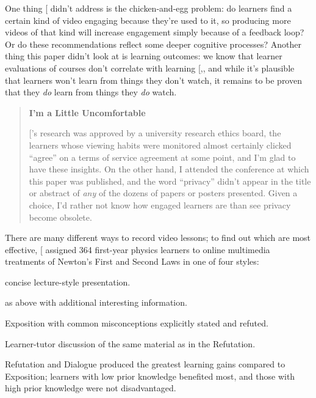 One thing {[}\protect[\hyperlink{b:Guo2014}{Guo2014}]{]} didn't address is the chicken-and-egg
problem: do learners find a certain kind of video engaging because
they're used to it, so producing more videos of that kind will
increase engagement simply because of a feedback loop? Or do these
recommendations reflect some deeper cognitive processes? Another thing
this paper didn't look at is learning outcomes: we know that learner
evaluations of courses don't correlate with learning
{[},\protect[\hyperlink{b:Uttl2017}{Uttl2017}]{]}, and while it's plausible that
learners won't learn from things they don't watch, it remains to be
proven that they \emph{do} learn from things they \emph{do} watch.

\begin{quote}\setlength{\parindent}{0pt}
\textbf{I'm a Little Uncomfortable}

{[}\protect[\hyperlink{b:Guo2014}{Guo2014}]{]}'s research was approved by a university research
ethics board, the learners whose viewing habits were monitored almost
certainly clicked ``agree'' on a terms of service agreement at some
point, and I'm glad to have these insights. On the other hand, I
attended the conference at which this paper was published, and the
word ``privacy'' didn't appear in the title or abstract of \emph{any} of the
dozens of papers or posters presented. Given a choice, I'd rather not
know how engaged learners are than see privacy become obsolete.
\end{quote}

There are many different ways to record video lessons; to find out which
are most effective, {[}\protect[\hyperlink{b:Mull2007a}{Mull2007a}]{]} assigned 364 first-year physics
learners to online multimedia treatments of Newton's First and Second
Laws in one of four styles:

\begin{description}
\tightlist
\item[Exposition:]
concise lecture-style presentation.
\item[Extended Exposition:]
as above with additional interesting information.
\item[Refutation:]
Exposition with common misconceptions explicitly stated and refuted.
\item[Dialog:]
Learner-tutor discussion of the same material as in the Refutation.
\end{description}

Refutation and Dialogue produced the greatest learning gains compared to
Exposition; learners with low prior knowledge benefited most, and those
with high prior knowledge were not disadvantaged.

